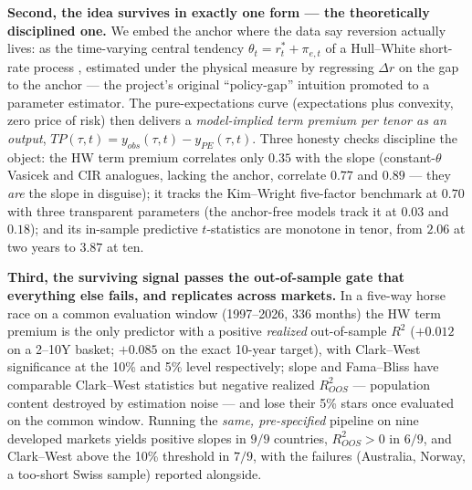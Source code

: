 \documentclass[11pt]{article}
\begin{document}
\textbf{Second, the idea survives in exactly one form --- the theoretically disciplined
one.} We embed the anchor where the data say reversion actually lives: as the time-varying
central tendency $\theta_t=r^*_t+\pi_{e,t}$ of a Hull--White short-rate process
\citep{hullwhite}, estimated under the physical measure by regressing $\Delta r$ on the gap
to the anchor --- the project's original ``policy-gap'' intuition promoted to a parameter
estimator. The pure-expectations curve (expectations plus convexity, zero price of risk)
then delivers a \emph{model-implied term premium per tenor as an output},
$TP(\tau,t)=y_{obs}(\tau,t)-y_{PE}(\tau,t)$. Three honesty checks discipline the object:
the HW term premium correlates only $0.35$ with the slope (constant-$\theta$ Vasicek and
CIR analogues, lacking the anchor, correlate $0.77$ and $0.89$ --- they \emph{are} the
slope in disguise); it tracks the Kim--Wright five-factor benchmark at $0.70$ with three
transparent parameters (the anchor-free models track it at $0.03$ and $0.18$); and its
in-sample predictive $t$-statistics are monotone in tenor, from $2.06$ at two years to
$3.87$ at ten.

\textbf{Third, the surviving signal passes the out-of-sample gate that everything else
fails, and replicates across markets.} In a five-way horse race on a common evaluation
window (1997--2026, 336 months) the HW term premium is the only predictor with a positive
\emph{realized} out-of-sample $R^2$ ($+0.012$ on a 2--10Y basket; $+0.085$ on the exact
10-year target), with Clark--West significance at the 10\% and 5\% level respectively;
slope and Fama--Bliss have comparable Clark--West statistics but negative realized
$R^2_{OOS}$ --- population content destroyed by estimation noise --- and lose their 5\%
stars once evaluated on the common window. Running the \emph{same, pre-specified} pipeline
on nine developed markets yields positive slopes in $9/9$ countries, $R^2_{OOS}>0$ in
$6/9$, and Clark--West above the 10\% threshold in $7/9$, with the failures (Australia,
Norway, a too-short Swiss sample) reported alongside.
\end{document}
